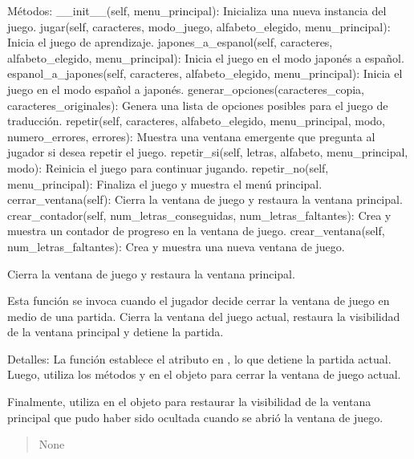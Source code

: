 \documentclass[letterpaper,10pt,spanish]{sphinxmanual}
\begin{document}
\begin{fulllineitems}
\sphinxAtStartPar
Métodos:
\sphinxhyphen{} \_\_init\_\_(self, menu\_principal): Inicializa una nueva instancia del juego.
\sphinxhyphen{} jugar(self, caracteres, modo\_juego, alfabeto\_elegido, menu\_principal): Inicia el juego de aprendizaje.
\sphinxhyphen{} japones\_a\_espanol(self, caracteres, alfabeto\_elegido, menu\_principal): Inicia el juego en el modo japonés a
español.
\sphinxhyphen{} espanol\_a\_japones(self, caracteres, alfabeto\_elegido, menu\_principal): Inicia el juego en el modo español a
japonés.
\sphinxhyphen{} generar\_opciones(caracteres\_copia, caracteres\_originales): Genera una lista de opciones posibles para el juego de
traducción.
\sphinxhyphen{} repetir(self, caracteres, alfabeto\_elegido, menu\_principal, modo, numero\_errores, errores): Muestra una ventana
emergente que pregunta al jugador si desea repetir el juego.
\sphinxhyphen{} repetir\_si(self, letras, alfabeto, menu\_principal, modo): Reinicia el juego para continuar jugando.
\sphinxhyphen{} repetir\_no(self, menu\_principal): Finaliza el juego y muestra el menú principal.
\sphinxhyphen{} cerrar\_ventana(self): Cierra la ventana de juego y restaura la ventana principal.
\sphinxhyphen{} crear\_contador(self, num\_letras\_conseguidas, num\_letras\_faltantes): Crea y muestra un contador de progreso en la
ventana de juego.
\sphinxhyphen{} crear\_ventana(self, num\_letras\_faltantes): Crea y muestra una nueva ventana de juego.

\begin{fulllineitems}
\label{\detokenize{juego:juego.Juego.cerrar_ventana}}
\pysigstartsignatures
{}
\pysigstopsignatures
\sphinxAtStartPar
Cierra la ventana de juego y restaura la ventana principal.

\sphinxAtStartPar
Esta función se invoca cuando el jugador decide cerrar la ventana de juego en medio de una partida.
Cierra la ventana del juego actual, restaura la visibilidad de la ventana principal y detiene la partida.

\sphinxAtStartPar
Detalles:
La función establece el atributo  en , lo que detiene la partida actual. Luego, utiliza
los métodos  y  en el objeto  para cerrar la ventana de juego actual.

\sphinxAtStartPar
Finalmente, utiliza  en el objeto  para restaurar la visibilidad de la
ventana principal que pudo haber sido ocultada cuando se abrió la ventana de juego.
\begin{quote}\begin{description}
\sphinxAtStartPar
None


\end{description}
\end{quote}
\end{fulllineitems}
\end{fulllineitems}
\end{document}
